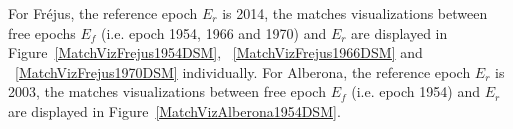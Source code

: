 For Fr{\'e}jus, the reference epoch $E_r$ is 2014, the matches visualizations between free epochs $E_f$ (i.e. epoch 1954, 1966 and 1970) and $E_r$ are displayed in Figure~\ref{MatchVizFrejus1954DSM}, ~\ref{MatchVizFrejus1966DSM} and ~\ref{MatchVizFrejus1970DSM} individually. 
For Alberona, the reference epoch $E_r$ is 2003, the matches visualizations between free epoch $E_f$ (i.e. epoch 1954) and $E_r$ are displayed in Figure~\ref{MatchVizAlberona1954DSM}. %
%

